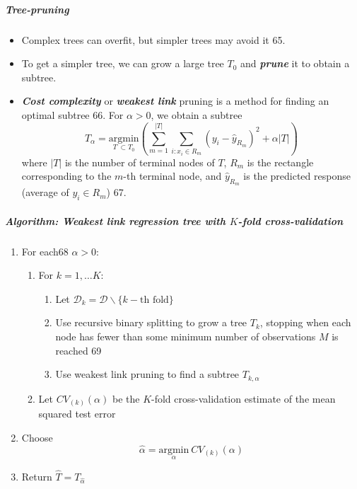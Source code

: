 \documentclass[11pt]{article}
\providecommand{\tightlist}{%
      \setlength{\itemsep}{0pt}\setlength{\parskip}{0pt}}
\begin{document}
    \hypertarget{tree-pruning}{%
\subparagraph{Tree-pruning}\label{tree-pruning}}

    \begin{itemize}
\tightlist
\item
  Complex trees can overfit, but simpler trees may avoid it 65.
\item
  To get a simpler tree, we can grow a large tree \(T_0\) and
  \textbf{\emph{prune}} it to obtain a subtree.
\item
  \textbf{\emph{Cost complexity}} or \textbf{\emph{weakest link}}
  pruning is a method for finding an optimal subtree 66. For
  \(\alpha > 0\), we obtain a subtree
  \[ T_\alpha = \underset{T\ \subset T_0}{\text{argmin}}
                  \left(\sum_{m=1}^{|T|} \sum_{i: x_i \in R_m} \left(y_i - \hat{y}_{R_m}\right)^2 + \alpha|T|\right)\]
  where \(|T|\) is the number of terminal nodes of \(T\), \(R_m\) is the
  rectangle corresponding to the \(m\)-th terminal node, and
  \(\hat{y}_{R_m}\) is the predicted response (average of
  \(y_i\in R_m\)) 67.
\end{itemize}

    \hypertarget{algorithm-weakest-link-regression-tree-with-k-fold-cross-validation}{%
\subparagraph{\texorpdfstring{Algorithm: Weakest link regression tree
with \(K\)-fold
cross-validation}{Algorithm: Weakest link regression tree with K-fold cross-validation}}\label{algorithm-weakest-link-regression-tree-with-k-fold-cross-validation}}

    \begin{enumerate}
\def\labelenumi{\arabic{enumi}.}
\item
  For each68 \(\alpha > 0\):

  \begin{enumerate}
  \def\labelenumii{\arabic{enumii}.}
  \tightlist
  \item
    For \(k = 1, \dots K\):

    \begin{enumerate}
    \def\labelenumiii{\arabic{enumiii}.}
    \tightlist
    \item
      Let
      \(\mathcal{D}_k = \mathcal{D} \backslash \{k-\text{th fold}\}\)
    \item
      Use recursive binary splitting to grow a tree \(T_{k}\), stopping
      when each node has fewer than some minimum number of observations
      \(M\) is reached 69
    \item
      Use weakest link pruning to find a subtree \(T_{k, \alpha}\)
    \end{enumerate}
  \item
    Let \(CV_{(k)}(\alpha)\) be the \(K\)-fold cross-validation estimate
    of the mean squared test error
  \end{enumerate}
\item
  Choose
  \[ \hat{\alpha} = \underset{\alpha}{\text{argmin}}\ CV_{(k)}(\alpha) \]
\item
  Return \(\hat{T} = T_{\hat{\alpha}}\)
\end{enumerate}
\end{document}
